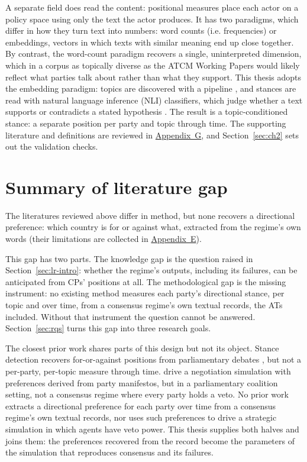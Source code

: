 A separate field does read the content: positional measures place each actor on a policy space
using only the text the actor produces. It has two paradigms, which differ in how they turn text
into numbers: word counts (i.e. frequencies) or embeddings, vectors in which texts with similar
meaning end up close together. By contrast, the word-count paradigm recovers a single, uninterpreted
dimension, which in a corpus as topically diverse as the ATCM Working Papers would likely
reflect what parties talk about rather than what they support. This thesis adopts the
embedding paradigm: topics are discovered with a pipeline \parencite{Grootendorst_BERTopic}, and
stances are read with natural language inference (NLI) classifiers, which judge whether a text
supports or contradicts a stated hypothesis \parencite{Burnham2023,Abercrombie2022}. The result
is a topic-conditioned stance: a separate position per party and topic through time. The
supporting literature and definitions are reviewed in \hyperref[app:g]{Appendix~G}, and Section~\ref{sec:ch2} sets
out the validation checks.


\section{Summary of literature gap}
\label{sec:gap}

The literatures reviewed above differ in method, but none recovers a directional preference: which country
is for or against what, extracted from the regime's own words (their limitations are collected
in \hyperref[app:e]{Appendix~E}).

This gap has two parts. The knowledge gap is the question raised in Section~\ref{sec:lr-intro}:
whether the regime's outputs, including its failures, can be anticipated from CPs'
positions at all. The methodological gap is
the missing instrument: no existing method measures each party's directional stance, per topic
and over time, from a consensus regime's own textual records, the ATs included. Without that instrument the question cannot be
answered. Section~\ref{sec:rqs} turns this gap into three research goals.

The closest prior work shares parts of this design but not its object. Stance detection recovers
for-or-against positions from parliamentary debates \parencite{Abercrombie2022}, but not a
per-party, per-topic measure through time. \textcite{Moghimifar2024} drive a negotiation
simulation with preferences derived from party manifestos, but in a parliamentary coalition
setting, not a consensus regime where every party holds a veto.
No prior work extracts a directional preference for each party over time from a consensus
regime's own textual records, nor uses such preferences to drive a strategic simulation in which agents have veto
power. This thesis supplies both halves and joins them: the preferences recovered from the record become the
 parameters of the simulation that reproduces consensus and its failures.


